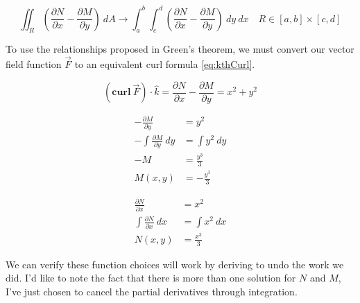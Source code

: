 \documentclass{article}
\begin{document}
\begin{equation}
    \iint_R{\left(\frac{\partial N}{\partial x} - \frac{\partial M}{\partial y}\right)}\:dA \to \int_a^b\int_c^d{\left(\frac{\partial N}{\partial x} - \frac{\partial M}{\partial y}\right)}\:dy\:dx \quad R \in \left[a, b\right] \times \left[c, d\right]
\end{equation}

To use the relationships proposed in Green's theorem, we must convert our vector field function $\vec{F}$ to an equivalent curl formula \eqref{eq:kthCurl}.

\begin{equation*}
    (\textbf{curl} \: \vec{F}) \cdot \hat{k} = \frac{\partial N}{\partial x} - \frac{\partial M}{\partial y} = x^2 + y^2
\end{equation*}

\begin{center}
\noindent\begin{minipage}{0.4\linewidth}
    \begin{equation*}
        \begin{aligned}
            -\frac{\partial M}{\partial y} &= y^2 \\
            -\int\frac{\partial M}{\partial y}\:dy &= \int{y^2}\:dy \\
            -M &= \frac{y^3}{3} \\
            M(x,y) &= -\frac{y^3}{3}
        \end{aligned}
    \end{equation*}
\end{minipage}
\begin{minipage}{0.4\linewidth}
    \begin{equation*}
        \begin{aligned}
            \frac{\partial N}{\partial x} &= x^2 \\
            \int\frac{\partial N}{\partial x}\:dx &= \int{x^2}\:dx \\
            N(x,y) &= \frac{x^3}{3}
        \end{aligned}
    \end{equation*}%
\end{minipage}
\end{center}

We can verify these function choices will work by deriving to undo the work we did. I'd like to note the fact that there is more than one solution for $N$ and $M$, I've just chosen to cancel the partial derivatives through integration.
\end{document}

